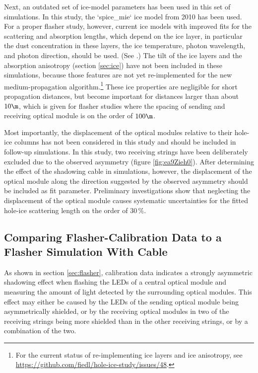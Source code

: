 Next, an outdated set of ice-model parameters has been used in this set of simulations. In this study, the `spice_mie` ice model from 2010 has been used. For a proper flasher study, however, current ice models with improved fits for the scattering and absorption lengths, which depend on the ice layer, in particular the dust concentration in these layers, the ice temperature, photon wavelength, and photon direction, should be used. (See \cite{icepaper,flasherdataderivedicemodels}.)
The tilt of the ice layers and the absorption anisotropy (section \ref{sec:ice}) have not been included in these simulations, because those features are not yet re-implemented for the new medium-propagation algorithm.\footnote{For the current status of re-implementing ice layers and ice anisotropy, see \url{https://github.com/fiedl/hole-ice-study/issues/48}.} These ice properties are negligible for short propagation distances, but become important for distances larger than about $10\m$, which is given for flasher studies where the spacing of sending and receiving optical module is on the order of $100\m$.

Most importantly, the displacement of the optical modules relative to their hole-ice columns has not been considered in this study and should be included in follow-up simulations. In this study, two receiving strings have been deliberately excluded due to the observed asymmetry (figure \ref{fig:ea9Zieh0}). After determining the effect of the shadowing cable in simulations, however, the displacement of the optical module along the direction suggested by the observed asymmetry should be included as fit parameter. Preliminary investigations show that neglecting the displacement of the optical module causes systematic uncertainties for the fitted hole-ice scattering length on the order of $30\,\%$.


\subsection{Comparing Flasher-Calibration Data to a Flasher Simulation With Cable}
\label{sec:flasher_with_cable}

As shown in section \ref{sec:flasher}, calibration data indicates a strongly asymmetric shadowing effect when flashing the LEDs of a central optical module and measuring the amount of light detected by the surrounding optical modules. This effect may either be caused by the LEDs of the sending optical module being asymmetrically shielded, or by the receiving optical modules in two of the receiving strings being more shielded than in the other receiving strings, or by a combination of the two.

